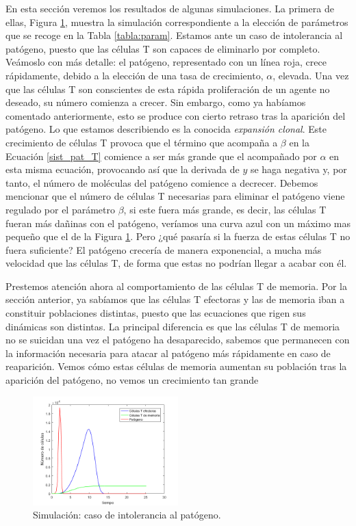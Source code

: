 En esta sección  veremos los resultados de algunas simulaciones. La primera de ellas, Figura \ref{fig:intolerance}, muestra la simulación correspondiente a la elección de parámetros que se recoge en la Tabla \ref{tabla:param}. Estamos ante un caso de intolerancia al patógeno, puesto que las células T son capaces de eliminarlo por completo. 
Veámoslo con más detalle: el patógeno, representado con un línea roja, crece rápidamente, debido a la elección de una tasa de crecimiento, $\alpha$, elevada. Una vez que las células T son conscientes de esta rápida proliferación de un agente no deseado, su número comienza a crecer. Sin embargo, como ya habíamos comentado anteriormente, esto se produce con cierto retraso tras la aparición del patógeno. Lo que estamos describiendo es la conocida \textit{expansión clonal}. Este crecimiento de células T provoca que el término que acompaña a $\beta$ en la Ecuación \ref{sist_pat_T} comience a ser más grande que el acompañado por $\alpha$ en esta misma ecuación, provocando así que la derivada de $y$ se haga negativa y, por tanto, el número de moléculas del patógeno comience a decrecer. Debemos mencionar que el número de células T necesarias para eliminar el patógeno viene regulado por el parámetro $\beta$, si este fuera más grande, es decir, las células T fueran más dañinas con el patógeno, veríamos una curva azul con un máximo mas pequeño que el de la Figura \ref{fig:intolerance}. Pero ¿qué pasaría si la fuerza de estas células T no fuera suficiente? El patógeno crecería de manera exponencial, a mucha más velocidad que las células T, de forma que estas no podrían llegar a acabar con él. 

Prestemos atención ahora al comportamiento de las células T de memoria. Por la sección anterior, ya sabíamos que las células T efectoras y las de memoria iban a constituir poblaciones distintas, puesto que las ecuaciones que rigen sus dinámicas son distintas. La principal diferencia es que las células T de memoria no se suicidan una vez el patógeno ha desaparecido, sabemos que permanecen con la información necesaria para atacar al patógeno más rápidamente en caso de reaparición. Vemos cómo estas células de memoria aumentan su población tras la aparición del patógeno, no vemos un crecimiento tan grande 


\begin{figure}[t]
	\centering
	\includegraphics[width=0.5\textwidth]{Imagenes/Simulaciones/intolerance}
	\caption{Simulación: caso de intolerancia al patógeno.}
	\label{fig:intolerance}
\end{figure}
